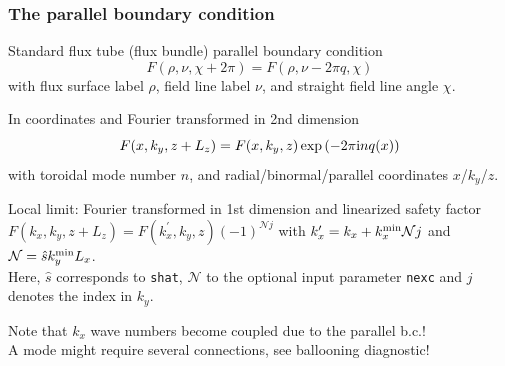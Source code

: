 \documentclass[9pt]{beamer}
\begin{document}
\begin{frame}
  \frametitle{The parallel boundary condition}

\begin{block}{Standard flux tube (flux bundle) parallel boundary condition}
$$F(\rho,\nu,\chi+2\pi) = F(\rho,\nu-2\pi q,\chi)$$
with flux surface label $\rho$, field line label $\nu$, and straight field line angle $\chi$.
\end{block}

\begin{block}{In \gene coordinates and Fourier transformed in 2nd dimension}
$$F(x,k_y,z+L_z) = F(x,k_y,z) \exp{\left(- 2\pi \text{i}n q(x)\right)}$$
with toroidal mode number $n$, and radial/binormal/parallel coordinates $x$/$k_y$/$z$.
\end{block}

\begin{block}{Local limit: Fourier transformed in 1st dimension and linearized safety factor}
$F(k_x,k_y,z+L_z) = F(k_x^\prime,k_y,z) (-1)^{\mathcal{N}j}$ with $k_x^\prime = k_x + k_x^{\rm min} \mathcal{N}j$
and $\mathcal{N} = \hat{s}k_y^{\rm min} L_x$. \\[1ex]
Here, $\hat{s}$ corresponds to {\tt shat}, $\mathcal{N}$ to the optional input parameter {\tt nexc} and $j$
denotes the index in $k_y$.
\end{block}

\begin{alertblock}{}
Note that $k_x$ wave numbers become coupled due to the parallel b.c.!\\
A mode might require several connections, see ballooning diagnostic!
\end{alertblock}

\end{frame}

\end{document}
